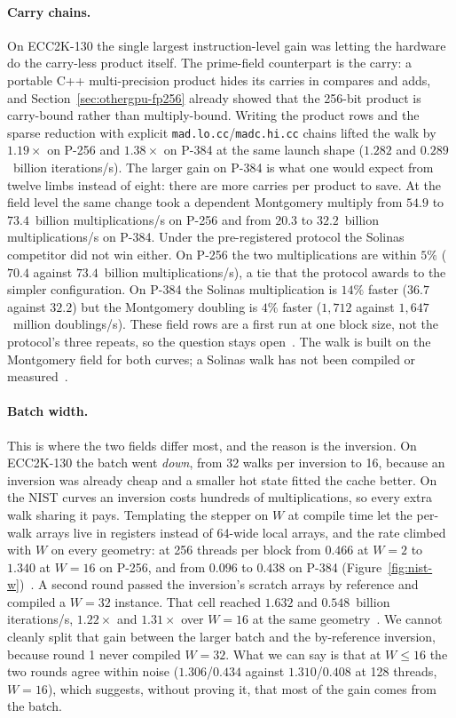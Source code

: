 \paragraph{Carry chains.} On ECC2K-130 the single largest
instruction-level gain was letting the hardware do the carry-less
product itself. The prime-field counterpart is the carry: a portable
C++ multi-precision product hides its carries in compares and adds,
and Section~\ref{sec:othergpu-fp256} already showed that the
256-bit product is carry-bound rather than multiply-bound. Writing the
product rows and the sparse reduction with explicit
\texttt{mad.lo.cc}/\texttt{madc.hi.cc} chains lifted the walk by
$1.19\times$ on P-256 and $1.38\times$ on P-384 at the same launch
shape ($1.282$ and $0.289$~billion iterations/s). The larger gain on P-384 is what
one would expect from twelve limbs instead of eight: there are more
carries per product to save. At the field level the same change took
a dependent Montgomery multiply from $54.9$ to $73.4$~billion multiplications/s on P-256 and
from $20.3$ to $32.2$~billion multiplications/s on P-384. Under the pre-registered protocol the Solinas competitor did not
win either. On P-256 the two multiplications are within $5\%$ ($70.4$
against $73.4$~billion multiplications/s), a tie that the protocol
awards to the simpler configuration. On P-384 the Solinas
multiplication is $14\%$ faster ($36.7$ against $32.2$) but the
Montgomery doubling is $4\%$ faster ($1{,}712$ against $1{,}647$~million
doublings/s). These field rows are a first run at one block size, not
the protocol's three repeats, so the question stays
open~. The walk is built
on the Montgomery field for both curves; a Solinas walk has not been compiled or measured~.

\paragraph{Batch width.} This is where the two fields differ most,
and the reason is the inversion. On ECC2K-130 the batch went
\emph{down}, from 32 walks per inversion to 16, because an inversion
was already cheap and a smaller hot state fitted the cache better. On
the NIST curves an inversion costs hundreds of multiplications, so
every extra walk sharing it pays. Templating the stepper on $W$ at
compile time let the per-walk arrays live in registers instead of
64-wide local arrays, and the rate climbed with $W$ on every
geometry: at 256 threads per block from $0.466$ at $W=2$ to $1.340$ at
$W=16$ on P-256, and from $0.096$ to $0.438$ on P-384
(Figure~\ref{fig:nist-w})~. A
second round passed the inversion's scratch arrays by reference and
compiled a $W=32$ instance. That cell reached $1.632$ and
$0.548$~billion iterations/s, $1.22\times$ and $1.31\times$ over $W=16$ at the
same geometry~.
We cannot cleanly split that gain between the larger batch and the
by-reference inversion, because round 1 never compiled $W=32$. What we
can say is that at $W\le16$ the two rounds agree within noise
($1.306$/$0.434$ against $1.310$/$0.408$ at 128 threads, $W=16$), which
suggests, without proving it, that most of the gain comes from the
batch.

